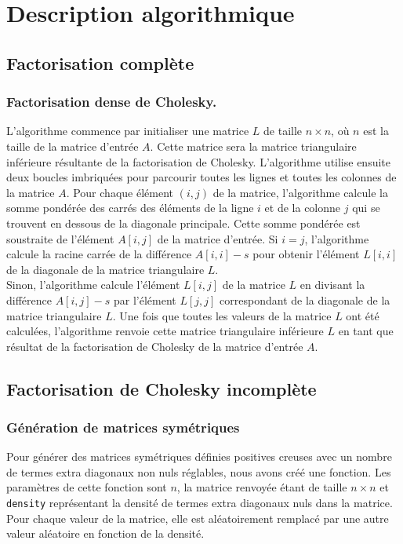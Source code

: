 \section{Description algorithmique}

\subsection{Factorisation complète}

\subsubsection{Factorisation dense de Cholesky.}

L'algorithme commence par initialiser une matrice $L$ de taille $n\times n$, où $n$ est la taille de la matrice d'entrée $A$. Cette matrice sera la matrice triangulaire inférieure résultante de la factorisation de Cholesky.
\medbreak
L'algorithme utilise ensuite deux boucles imbriquées pour parcourir toutes les lignes et toutes les colonnes de la matrice $A$. Pour chaque élément $(i,j)$ de la matrice, l'algorithme calcule la somme pondérée des carrés des éléments de la ligne $i$ et de la colonne $j$ qui se trouvent en dessous de la diagonale principale. Cette somme pondérée est soustraite de l'élément $A[i,j]$ de la matrice d'entrée.
\medbreak
Si $i = j$, l'algorithme calcule la racine carrée de la différence $A[i,i] - s$ pour obtenir l'élément $L[i,i]$ de la diagonale de la matrice triangulaire $L$. \\
Sinon, l'algorithme calcule l'élément $L[i,j]$ de la matrice $L$ en divisant la différence $A[i,j] - s$ par l'élément $L[j,j]$ correspondant de la diagonale de la matrice triangulaire $L$.
\medbreak
Une fois que toutes les valeurs de la matrice $L$ ont été calculées, l'algorithme renvoie cette matrice triangulaire inférieure $L$ en tant que résultat de la factorisation de Cholesky de la matrice d'entrée $A$.

\subsection{Factorisation de Cholesky incomplète}

\subsubsection{Génération de matrices symétriques}

Pour générer des matrices symétriques définies positives creuses avec un nombre de termes extra diagonaux non nuls réglables, nous avons créé une fonction. Les paramètres de cette fonction sont $n$, la matrice renvoyée étant de taille $n\times n$ et \verb|density| représentant la densité de termes extra diagonaux nuls dans la matrice. Pour chaque valeur de la matrice, elle est aléatoirement remplacé par une autre valeur aléatoire en fonction de la densité.

